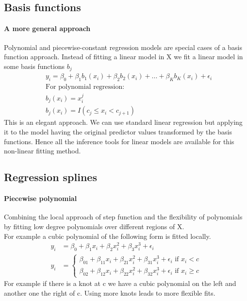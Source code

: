 \documentclass[../document.tex]{subfiles}
\begin{document}
	\subsection{Basis functions}
	\paragraph{A more general approach}
	Polynomial and piecewise-constant regression models are special cases of a basis function approach. Instead of fitting a linear model in X we fit a linear model in some basis functions \(b_{j}\)
	\begin{equation}
	\begin{split}
		&y_{i}=\beta_{0}+\beta_{1}b_{1}(x_{i})+\beta_{2}b_{2}(x_{i})+...+\beta_{K}b_{K}(x_{i})+\epsilon_{i}\\
		&\text{For polynomial regression:}\\
		&b_{j}(x_{i})=x_{i}^j\\
		&b_{j}(x_{i})=I(c_{j}\leq x_{i} < c_{j+1})
	\end{split}
	\end{equation}
	This is an elegant approach. We can use standard linear regression but applying it to the model having the original predictor values transformed by the basis functions. Hence all the inference tools for linear models are available for this non-linear fitting method.
	\subsection{Regression splines}
	\paragraph{Piecewise polynomial}
	Combining the local approach of step function and the flexibility of polynomials by fitting low degree polynomials over different regions of X.\\
	For example a cubic polynomial of the following form is fitted locally.
	\begin{equation}
	\begin{split}
		y_{i}&=\beta_{0}+\beta_{1}x_{i}+\beta_{2}x_{i}^2+\beta_{3}x_{i}^3+\epsilon_{i}\\
		y_{i}&=\begin{cases}
			\beta_{01}+\beta_{11}x_{i}+\beta_{21}x_{i}^2+\beta_{31}x_{i}^3+\epsilon_{i} \text{  if  } x_{i} < c\\
			\beta_{02}+\beta_{12}x_{i}+\beta_{22}x_{i}^2+\beta_{32}x_{i}^3+\epsilon_{i} \text{  if  } x_{i} \geq c
		\end{cases}
	\end{split}
	\end{equation}
	For example if there is a knot at c we have a cubic polynomial on the left and another one the right of c. Using more knots leads to more flexible fits.
\end{document}
